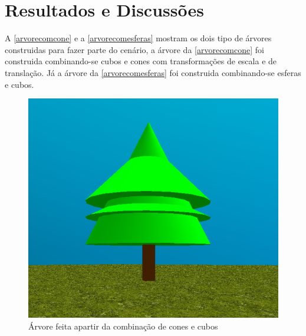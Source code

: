 \documentclass[
	12pt,				%
	openright,			%
	a4paper,			%
	english,			%
	french,				%
	spanish,			%
	brazil,				%
	]{abntex2}
\begin{document}
       
\chapter{Resultados e Discussões}
	A \autoref{arvorecomcone} e a \autoref{arvorecomesferas} mostram os dois tipo de árvores construidas para fazer parte do cenário, a árvore da \autoref{arvorecomcone} foi construida combinando-se cubos e cones com transformações de escala e de translação. Já a árvore da \autoref{arvorecomesferas} foi construida combinando-se esferas e cubos. 

\begin{figure}[H]
\centering 
\caption{Árvore feita apartir da combinação de cones e cubos} \label{arvorecomcone}
\includegraphics[scale=0.5]{imagens/arvorecomcones.png}
\end{figure}
\end{document}
